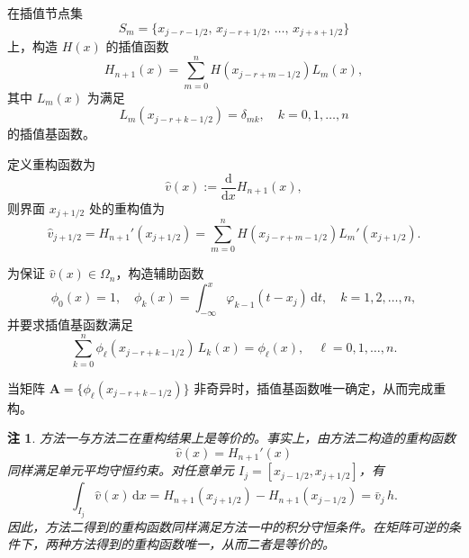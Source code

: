 \documentclass[12pt,a4paper]{article}
\newtheorem{remark}[theorem]{注}
\numberwithin{equation}{section}    %
\begin{document}
在插值节点集
\begin{equation}
    S_m = \bigl\{x_{j-r-1/2},\, x_{j-r+1/2},\, \ldots,\, x_{j+s+1/2}\bigr\}
\end{equation}
上，构造 $H(x)$ 的插值函数
\begin{equation}
    H_{n+1}(x) = \sum_{m=0}^{n} H\!\left(x_{j-r+m-1/2}\right) L_m(x),
\end{equation}
其中 $L_m(x)$ 为满足
\begin{equation}
    L_m\!\left(x_{j-r+k-1/2}\right) = \delta_{mk}, \quad k = 0,1, \ldots, n
\end{equation}
的插值基函数。

定义重构函数为
\begin{equation}
    \hat{v}(x) := \frac{\mathrm{d}}{\mathrm{d}x} H_{n+1}(x),
\end{equation}
则界面 $x_{j+1/2}$ 处的重构值为
\begin{equation}
    \hat{v}_{j+1/2} = H_{n+1}'\!\left(x_{j+1/2}\right)
    = \sum_{m=0}^{n} H\!\left(x_{j-r+m-1/2}\right) L_m'\!\left(x_{j+1/2}\right).
\end{equation}

为保证 $\hat{v}(x) \in \Omega_n$，构造辅助函数
\begin{equation}
    \phi_0(x) = 1, \quad \phi_k(x) = \int_{-\infty}^x \varphi_{k-1}(t - x_j)\,\mathrm{d}t, \quad k = 1,2,\ldots,n,
\end{equation}
并要求插值基函数满足
\begin{equation}
    \sum_{k=0}^{n} \phi_\ell\!\left(x_{j-r+k-1/2}\right)\,L_k(x)= \phi_\ell(x),
    \quad \ell = 0,1,\ldots,n.
\end{equation}


当矩阵 $\bm{A} = \{\phi_\ell(x_{j-r+k-1/2})\}$ 非奇异时，插值基函数唯一确定，从而完成重构。

\begin{remark}
    方法一与方法二在重构结果上是等价的。事实上，由方法二构造的重构函数
    \begin{equation}
        \hat{v}(x) = H_{n+1}'(x)
    \end{equation}
    同样满足单元平均守恒约束。对任意单元 $I_j = [x_{j-1/2}, x_{j+1/2}]$，有
    \begin{equation}
    \int_{I_j} \hat{v}(x)\,\mathrm{d}x
    = H_{n+1}(x_{j+1/2}) - H_{n+1}(x_{j-1/2}) = \bar{v}_j\,h.
    \end{equation}
    因此，方法二得到的重构函数同样满足方法一中的积分守恒条件。在矩阵可逆的条件下，两种方法得到的重构函数唯一，从而二者是等价的。
\end{remark}
\end{document}
